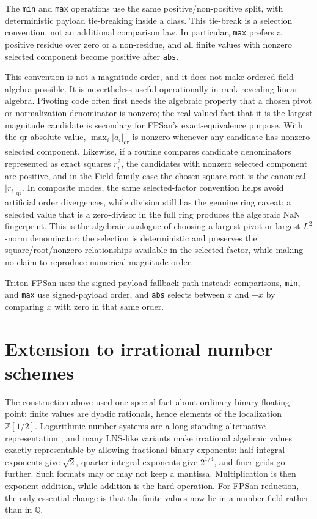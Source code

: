 \documentclass[11pt]{article}
\newcommand{\Z}{\mathbb{Z}}
\newcommand{\Q}{\mathbb{Q}}
\theoremstyle{plain}
\begin{document}
The \texttt{min} and \texttt{max} operations use the same positive/non-positive
split, with deterministic payload tie-breaking inside a class.  This tie-break
is a selection convention, not an additional comparison law.  In particular,
\texttt{max} prefers a positive residue over zero or a non-residue, and all
finite values with nonzero selected component become positive after
\texttt{abs}.

This convention is not a magnitude order, and it does not make ordered-field
algebra possible.  It is nevertheless useful operationally in rank-revealing
linear algebra.  Pivoting code often first needs the algebraic property that a
chosen pivot or normalization denominator is nonzero; the real-valued fact that
it is the largest magnitude candidate is secondary for FPSan's exact-equivalence
purpose.  With the \(\mathrm{qr}\) absolute value,
\(\max_i |a_i|_{\mathrm{qr}}\) is nonzero
whenever any candidate has nonzero selected component.  Likewise, if a routine
compares candidate denominators represented as exact squares \(r_i^2\), the
candidates with nonzero selected component are positive, and in the Field-family
case the chosen square root is the canonical \(|r_i|_{\mathrm{qr}}\).  In
composite modes, the same selected-factor convention helps avoid artificial
order divergences, while division still has the genuine ring caveat: a selected
value that is a zero-divisor in the full ring produces the algebraic NaN
fingerprint.  This is the algebraic analogue of choosing a largest pivot or
largest \(L^2\)-norm denominator: the selection is deterministic and preserves
the square/root/nonzero relationships available in the selected factor, while
making no claim to reproduce numerical magnitude order.

Triton FPSan uses the signed-payload fallback path instead: comparisons,
\texttt{min}, and \texttt{max} use signed-payload order, and \texttt{abs}
selects between \(x\) and \(-x\) by comparing \(x\) with zero in that same
order.

\section{Extension to irrational number schemes}

The construction above used one special fact about ordinary binary floating
point: finite values are dyadic rationals, hence elements of the localization
\(\Z[1/2]\).  Logarithmic number systems are a long-standing alternative
representation \cite{swartzlander-alexopoulos,alam-garland-gregg,nguyen-solovyev-gopalakrishnan},
and many LNS-like variants make irrational algebraic values exactly
representable by allowing fractional binary exponents: half-integral exponents
give \(\sqrt2\), quarter-integral exponents give \(2^{1/4}\), and finer grids
go further.  Such formats may or may not keep a mantissa.  Multiplication is
then exponent addition, while addition is the hard operation.  For FPSan
reduction, the only essential change is that the finite values now lie in a
number field rather than in \(\Q\).
\end{document}
